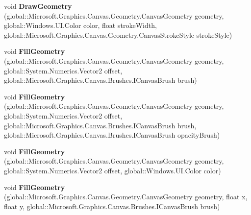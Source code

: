 \begin{DoxyCompactItemize}
\item 
\mbox{\label{class_microsoft_1_1_graphics_1_1_canvas_1_1_canvas_drawing_session_a2bbd4068f7c607d0644555f1e6268edb}} 
void {\bfseries Draw\+Geometry} (global\+::\+Microsoft.\+Graphics.\+Canvas.\+Geometry.\+Canvas\+Geometry geometry, global\+::\+Windows.\+U\+I.\+Color color, float stroke\+Width, global\+::\+Microsoft.\+Graphics.\+Canvas.\+Geometry.\+Canvas\+Stroke\+Style stroke\+Style)
\item 
\mbox{\label{class_microsoft_1_1_graphics_1_1_canvas_1_1_canvas_drawing_session_a84e8200e7ed30c69d67bebf3d87953a4}} 
void {\bfseries Fill\+Geometry} (global\+::\+Microsoft.\+Graphics.\+Canvas.\+Geometry.\+Canvas\+Geometry geometry, global\+::\+System.\+Numerics.\+Vector2 offset, global\+::\+Microsoft.\+Graphics.\+Canvas.\+Brushes.\+I\+Canvas\+Brush brush)
\item 
\mbox{\label{class_microsoft_1_1_graphics_1_1_canvas_1_1_canvas_drawing_session_aad5da577208ccdc82b33878e8418942f}} 
void {\bfseries Fill\+Geometry} (global\+::\+Microsoft.\+Graphics.\+Canvas.\+Geometry.\+Canvas\+Geometry geometry, global\+::\+System.\+Numerics.\+Vector2 offset, global\+::\+Microsoft.\+Graphics.\+Canvas.\+Brushes.\+I\+Canvas\+Brush brush, global\+::\+Microsoft.\+Graphics.\+Canvas.\+Brushes.\+I\+Canvas\+Brush opacity\+Brush)
\item 
\mbox{\label{class_microsoft_1_1_graphics_1_1_canvas_1_1_canvas_drawing_session_ac1e61251a101f5c7bfa364523abf1828}} 
void {\bfseries Fill\+Geometry} (global\+::\+Microsoft.\+Graphics.\+Canvas.\+Geometry.\+Canvas\+Geometry geometry, global\+::\+System.\+Numerics.\+Vector2 offset, global\+::\+Windows.\+U\+I.\+Color color)
\item 
\mbox{\label{class_microsoft_1_1_graphics_1_1_canvas_1_1_canvas_drawing_session_a1d3d1094412613a53a5ef240d57701f0}} 
void {\bfseries Fill\+Geometry} (global\+::\+Microsoft.\+Graphics.\+Canvas.\+Geometry.\+Canvas\+Geometry geometry, float x, float y, global\+::\+Microsoft.\+Graphics.\+Canvas.\+Brushes.\+I\+Canvas\+Brush brush)

\end{DoxyCompactItemize}
